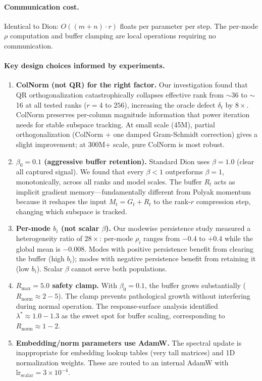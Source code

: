 \documentclass[11pt]{article}
\begin{document}
\paragraph{Communication cost.} Identical to Dion: $O((m+n) \cdot r)$ floats per parameter per step. The per-mode $\rho$ computation and buffer clamping are local operations requiring no communication.

\paragraph{Key design choices informed by experiments.}

\begin{enumerate}
    \item \textbf{ColNorm (not QR) for the right factor.} Our investigation found that QR orthogonalization catastrophically collapses effective rank from $\sim$36 to $\sim$16 at all tested ranks ($r = 4$ to $256$), increasing the oracle defect $\delta_t$ by $8\times$. ColNorm preserves per-column magnitude information that power iteration needs for stable subspace tracking. At small scale (45M), partial orthogonalization (ColNorm + one damped Gram-Schmidt correction) gives a slight improvement; at 300M+ scale, pure ColNorm is most robust.

    \item \textbf{$\beta_0 = 0.1$ (aggressive buffer retention).} Standard Dion uses $\beta = 1.0$ (clear all captured signal). We found that every $\beta < 1$ outperforms $\beta = 1$, monotonically, across all ranks and model scales. The buffer $R_t$ acts as implicit gradient memory---fundamentally different from Polyak momentum because it reshapes the input $M_t = G_t + R_t$ to the rank-$r$ compression step, changing which subspace is tracked.

    \item \textbf{Per-mode $b_i$ (not scalar $\beta$).} Our modewise persistence study measured a heterogeneity ratio of $28\times$: per-mode $\rho_i$ ranges from $-0.4$ to $+0.4$ while the global mean is $-0.008$. Modes with positive persistence benefit from clearing the buffer (high $b_i$); modes with negative persistence benefit from retaining it (low $b_i$). Scalar $\beta$ cannot serve both populations.

    \item \textbf{$R_{\max} = 5.0$ safety clamp.} With $\beta_0 = 0.1$, the buffer grows substantially ($R_{\text{norm}} \approx 2{-}5$). The clamp prevents pathological growth without interfering during normal operation. The response-surface analysis identified $\lambda^* \approx 1.0{-}1.3$ as the sweet spot for buffer scaling, corresponding to $R_{\text{norm}} \approx 1{-}2$.

    \item \textbf{Embedding/norm parameters use AdamW.} The spectral update is inappropriate for embedding lookup tables (very tall matrices) and 1D normalization weights. These are routed to an internal AdamW with $\text{lr}_{\text{scalar}} = 3 \times 10^{-4}$.
\end{enumerate}
\end{document}
